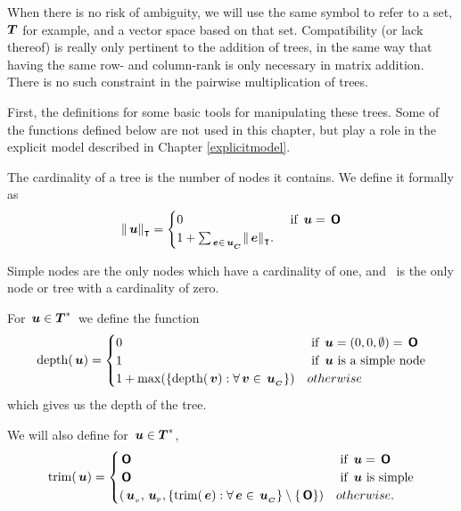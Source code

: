 When there is no risk of ambiguity, we will use the same symbol to
refer to a set, $\boldsymbol{T}$ for example, and a vector space based on that
set. Compatibility (or lack thereof) is really only pertinent to the
addition of trees, in the same way that having the same row- and
column-rank is only necessary in matrix addition.  There is no such
constraint in the pairwise multiplication of trees.


First, the definitions for some basic tools for manipulating these
trees. Some of the functions defined below are not used in this chapter, but
play a role in the explicit model described in Chapter \ref{explicitmodel}.

\begin{definition}
  The cardinality of a tree is the number of nodes it contains. We
  define it formally as
  \begin{align*}
  \lVert{\,\boldsymbol{u}}\rVert_{\intercal} = \begin{cases}
    0 & \text{ if } \,\boldsymbol{u} = \,\boldsymbol{\mathsf{O}}\\
    1 + \sum_{\,\boldsymbol{e}\in{\,\boldsymbol{u}}_{{}_{\boldsymbol{C}}}} \lVert{\,\boldsymbol{e}}\rVert_{\intercal}.
    \end{cases}
  \end{align*}

Simple nodes are the only nodes which have a cardinality of one, and \tzerotree\ is the only node or tree with a
cardinality of zero.
\end{definition}

\begin{definition}
  For \(\,\boldsymbol{u} \in \boldsymbol{T}^*\)\ we define the function
  \begin{align*}
    \operatorname{depth}(\,\boldsymbol{u}) = \begin{cases}
      0 & \text{ if } \,\boldsymbol{u} = (0,0,\emptyset) = \,\boldsymbol{\mathsf{O}} \\
      1 & \text{ if } \,\boldsymbol{u} \text{ is a simple node} \\
      1 + \max(\lbrace\operatorname{depth}(\,\boldsymbol{v}):\forall \,\boldsymbol{v} \in {\,\boldsymbol{u}}_{{}_{\boldsymbol{C}}}\rbrace) & otherwise
    \end{cases}
  \end{align*}
  which gives us the depth of the tree.
\end{definition}

\begin{definition}
  We will also define for \(\,\boldsymbol{u} \in \boldsymbol{T}^*\),
  \begin{align*}
      \operatorname{trim}(\,\boldsymbol{u}) = \begin{cases}
        \,\boldsymbol{\mathsf{O}} & \text{ if } \,\boldsymbol{u} = \,\boldsymbol{\mathsf{O}} \\
        \,\boldsymbol{\mathsf{O}} & \text{ if } \,\boldsymbol{u} \text{ is simple} \\
        \left({{\,\boldsymbol{u}}_{{}_{v}}},{{\,\boldsymbol{u}}_{{}_{\mathsf{P}}}}, {\lbrace \operatorname{trim}(\,\boldsymbol{e}): \forall\,\boldsymbol{e}\in{\,\boldsymbol{u}}_{{}_{\boldsymbol{C}}} \rbrace \setminus \{\,\boldsymbol{\mathsf{O}}\}}\right) & otherwise.
      \end{cases}
  \end{align*}
\end{definition}

